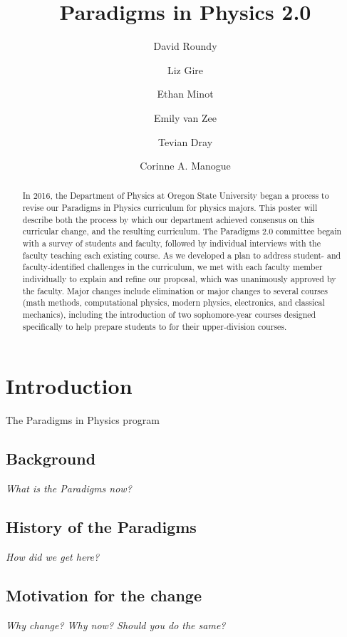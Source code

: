 \documentclass[english,aps,pra,reprint,noshowpacs,superscriptaddress]{revtex4-1}
\begin{document}
\title{Paradigms in Physics 2.0}
\author{David Roundy}
\author{Liz Gire}
\author{Ethan Minot}
\author{Emily van Zee}
\author{Tevian Dray}
\author{Corinne A. Manogue}


\begin{abstract}
In 2016, the Department of Physics at Oregon State University began a
process to revise our Paradigms in Physics curriculum for physics
majors.  This poster will describe both the process by which our
department achieved consensus on this curricular change, and the
resulting curriculum.  The Paradigms 2.0 committee begain with a
survey of students and faculty, followed by individual interviews with
the faculty teaching each existing course.  As we developed a plan to
address student- and faculty-identified challenges in the curriculum,
we met with each faculty member individually to explain and refine our
proposal, which was unanimously approved by the faculty.  Major
changes include elimination or major changes to several courses (math
methods, computational physics, modern physics, electronics, and
classical mechanics), including the introduction of two sophomore-year
courses designed specifically to help prepare students to for their
upper-division courses.
\end{abstract}

\maketitle

\section{Introduction}
The Paradigms in Physics program

\subsection{Background}
\emph{What is the Paradigms now?}
\subsection{History of the Paradigms}
\emph{How did we get here?~\cite{manogue2001paradigms}}
\subsection{Motivation for the change}
\emph{Why change? Why now? Should you do the same?}
\end{document}
